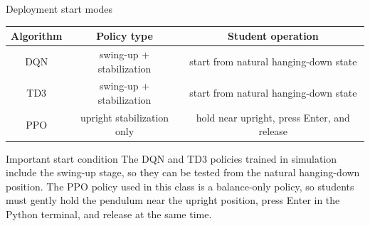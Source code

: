 \documentclass[aspectratio=169]{beamer}
\begin{document}
\begin{frame}{Deployment start modes}

\begin{center}
\begin{tabular}{c|c|c}
\hline
\textbf{Algorithm} & \textbf{Policy type} & \textbf{Student operation} \\
\hline
DQN &
swing-up + stabilization &
start from natural hanging-down state \\
\hline
TD3 &
swing-up + stabilization &
start from natural hanging-down state \\
\hline
PPO &
upright stabilization only &
hold near upright, press Enter, and release \\
\hline
\end{tabular}
\end{center}

\vspace{0.25cm}

\begin{alertblock}{Important start condition}
\small
The DQN and TD3 policies trained in simulation include the swing-up stage, so they can be tested from the natural hanging-down position.
The PPO policy used in this class is a balance-only policy, so students must gently hold the pendulum near the upright position, press Enter in the Python terminal, and release at the same time.
\end{alertblock}

\end{frame}
\end{document}
